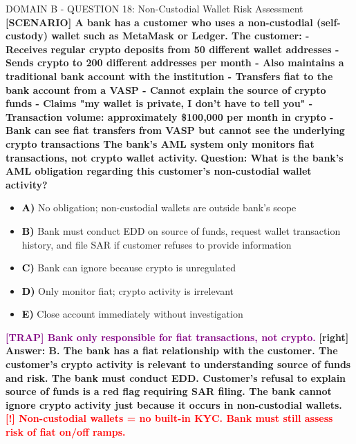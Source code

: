 \documentclass[11pt,a4paper]{beamer}
\newcommand{\redflag}[1]{\textcolor{red}{\textbf{[!] #1}}}
\newcommand{\trap}[1]{\textcolor{purple}{\textbf{[TRAP] #1}}}
\newcommand{\correct}[1]{\textcolor{green!50!black}{\textbf{[right] #1}}}
\newcommand{\scenario}[1]{\textcolor{blue!70!black}{\textbf{[SCENARIO] #1}}}
\newcommand{\option}[1]{\textcolor{black}{\textbf{#1}}}
\begin{document}
\begin{frame}{DOMAIN B - QUESTION 18: Non-Custodial Wallet Risk Assessment}
\scenario{A bank has a customer who uses a non-custodial (self-custody) wallet such as MetaMask or Ledger. The customer:
- Receives regular crypto deposits from 50 different wallet addresses
- Sends crypto to 200 different addresses per month
- Also maintains a traditional bank account with the institution
- Transfers fiat to the bank account from a VASP
- Cannot explain the source of crypto funds
- Claims "my wallet is private, I don't have to tell you"
- Transaction volume: approximately \$100,000 per month in crypto
- Bank can see fiat transfers from VASP but cannot see the underlying crypto transactions
The bank's AML system only monitors fiat transactions, not crypto wallet activity.}
\vspace{0.2cm}
\textbf{Question: What is the bank's AML obligation regarding this customer's non-custodial wallet activity?}
\vspace{0.1cm}
\begin{itemize}
    \item \option{A)} No obligation; non-custodial wallets are outside bank's scope
    \item \option{B)} Bank must conduct EDD on source of funds, request wallet transaction history, and file SAR if customer refuses to provide information
    \item \option{C)} Bank can ignore because crypto is unregulated
    \item \option{D)} Only monitor fiat; crypto activity is irrelevant
    \item \option{E)} Close account immediately without investigation
\end{itemize}
\vspace{0.2cm}
\trap{Bank only responsible for fiat transactions, not crypto.}
\correct{Answer: B. The bank has a fiat relationship with the customer. The customer's crypto activity is relevant to understanding source of funds and risk. The bank must conduct EDD. Customer's refusal to explain source of funds is a red flag requiring SAR filing. The bank cannot ignore crypto activity just because it occurs in non-custodial wallets.}
\redflag{Non-custodial wallets = no built-in KYC. Bank must still assess risk of fiat on/off ramps.}
\end{frame}
\end{document}
